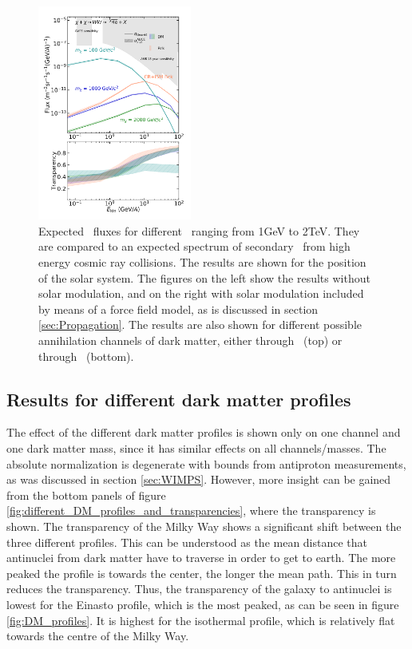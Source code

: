 \begin{figure}[hbtp]
    \includegraphics[width=0.45\textwidth]{figures/he3bar_WW_SM.png}
    \caption{Expected \ahe\ fluxes for different \dmm\ ranging from 1GeV to 2TeV. They are compared to an expected spectrum of secondary \ahe\ from high energy cosmic ray collisions. The results are shown for the position of the solar system. The figures on the left show the results without solar modulation, and on the right with solar modulation included by means of a force field model, as is discussed in section \ref{sec:Propagation}. The results are also shown for different possible annihilation channels of dark matter, either through \WW\ (top) or through \bb\ (bottom).}
    \label{fig:Results_He3_fluxes_diff_DM_masses}
\end{figure}

\subsection{Results for different dark matter profiles}\label{sec:ResDMProfiles}
The effect of the different dark matter profiles is shown only on one channel and one dark matter mass, since it has similar effects on all channels/masses. The absolute normalization is degenerate with bounds from antiproton measurements, as was discussed in section \ref{sec:WIMPS}. However, more insight can be gained from the bottom panels of figure \ref{fig:different_DM_profiles_and_transparencies}, where the transparency is shown. The transparency of the Milky Way shows a significant shift between the three different profiles. This can be understood as the mean distance that antinuclei from dark matter have to traverse in order to get to earth. The more peaked the profile is towards the center, the longer the mean path. This in turn reduces the transparency. Thus, the transparency of the galaxy to antinuclei is lowest for the Einasto profile, which is the most peaked, as can be seen in figure \ref{fig:DM_profiles}. It is highest for the isothermal profile, which is relatively flat towards the centre of the Milky Way. 

